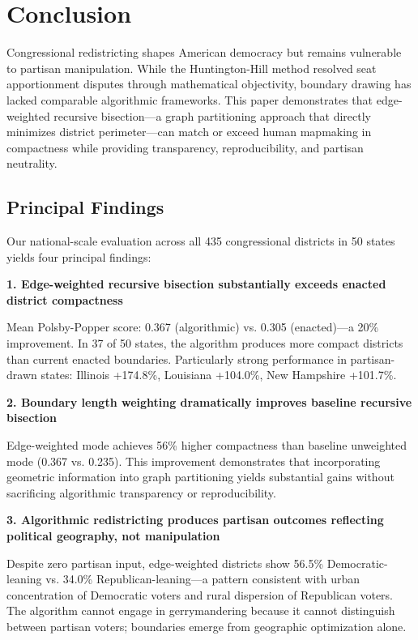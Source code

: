 \section{Conclusion}

Congressional redistricting shapes American democracy but remains vulnerable to partisan manipulation. While the Huntington-Hill method resolved seat apportionment disputes through mathematical objectivity, boundary drawing has lacked comparable algorithmic frameworks. This paper demonstrates that edge-weighted recursive bisection—a graph partitioning approach that directly minimizes district perimeter—can match or exceed human mapmaking in compactness while providing transparency, reproducibility, and partisan neutrality.

\subsection{Principal Findings}

Our national-scale evaluation across all 435 congressional districts in 50 states yields four principal findings:

\textbf{1. Edge-weighted recursive bisection substantially exceeds enacted district compactness}

Mean Polsby-Popper score: 0.367 (algorithmic) vs. 0.305 (enacted)—a 20\% improvement. In 37 of 50 states, the algorithm produces more compact districts than current enacted boundaries. Particularly strong performance in partisan-drawn states: Illinois +174.8\%, Louisiana +104.0\%, New Hampshire +101.7\%.

\textbf{2. Boundary length weighting dramatically improves baseline recursive bisection}

Edge-weighted mode achieves 56\% higher compactness than baseline unweighted mode (0.367 vs. 0.235). This improvement demonstrates that incorporating geometric information into graph partitioning yields substantial gains without sacrificing algorithmic transparency or reproducibility.

\textbf{3. Algorithmic redistricting produces partisan outcomes reflecting political geography, not manipulation}

Despite zero partisan input, edge-weighted districts show 56.5\% Democratic-leaning vs. 34.0\% Republican-leaning—a pattern consistent with urban concentration of Democratic voters and rural dispersion of Republican voters. The algorithm cannot engage in gerrymandering because it cannot distinguish between partisan voters; boundaries emerge from geographic optimization alone.

